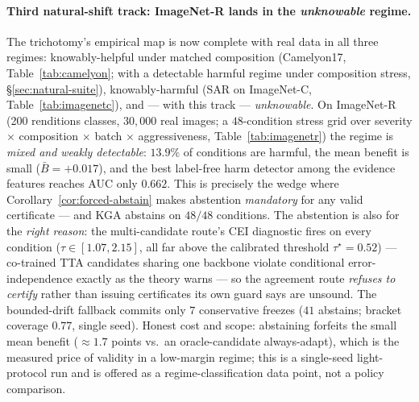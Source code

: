 \documentclass[conference]{IEEEtran}
\theoremstyle{plain}
\theoremstyle{definition}
\begin{document}
\paragraph{Third natural-shift track: ImageNet-R lands in the \emph{unknowable} regime.}
The trichotomy's empirical map is now complete with real data in all three regimes:
knowably-helpful under matched composition (Camelyon17, Table~\ref{tab:camelyon}; with a detectable
harmful regime under composition stress, \S\ref{sec:natural-suite}), knowably-harmful (SAR on
ImageNet-C, Table~\ref{tab:imagenetc}), and --- with this track --- \emph{unknowable}.
On ImageNet-R (200 renditions classes, $30{,}000$ real images; a $48$-condition stress
grid over severity $\times$ composition $\times$ batch $\times$ aggressiveness,
Table~\ref{tab:imagenetr}) the regime is \emph{mixed and weakly detectable}: $13.9\%$ of
conditions are harmful, the mean benefit is small ($\bar B={+}0.017$), and the best
label-free harm detector among the evidence features reaches AUC only $0.662$. This is
precisely the wedge where Corollary~\ref{cor:forced-abstain} makes abstention
\emph{mandatory} for any valid certificate --- and \textsc{KGA} abstains on $48/48$
conditions. The abstention is also for the \emph{right reason}: the multi-candidate
route's CEI diagnostic fires on every condition ($\tau\in[1.07,2.15]$, all far above the
calibrated threshold $\tau^\star{=}0.52$) --- co-trained TTA candidates sharing one
backbone violate conditional error-independence exactly as the theory warns --- so the
agreement route \emph{refuses to certify} rather than issuing certificates its own guard
says are unsound. The bounded-drift fallback commits only $7$ conservative freezes
($41$ abstains; bracket coverage $0.77$, single seed). Honest cost and scope: abstaining
forfeits the small mean benefit ($\approx\!1.7$ points vs.\ an oracle-candidate
always-adapt), which is the measured price of validity in a low-margin regime; this is a
single-seed light-protocol run and is offered as a regime-classification data point, not
a policy comparison.
\end{document}
